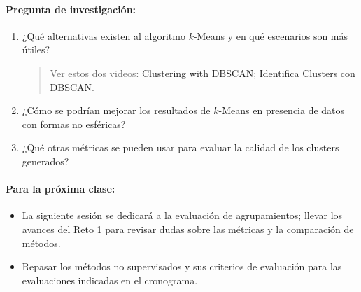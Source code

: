 \documentclass[a4,11pt]{aleph-notas}
\begin{document}
\paragraph{Pregunta de investigación:}  
\begin{enumerate}[leftmargin=*]
    \item ¿Qué alternativas existen al algoritmo $k$-Means y en qué escenarios son más útiles?
    \begin{quote}
        Ver estos dos videos: \href{https://www.youtube.com/watch?v=RDZUdRSDOok}{Clustering with DBSCAN}; \href{https://www.youtube.com/watch?v=HMis89lGdkA}{Identifica Clusters con DBSCAN}.
    \end{quote}
    \item ¿Cómo se podrían mejorar los resultados de $k$-Means en presencia de datos con formas no esféricas?
    \item ¿Qué otras métricas se pueden usar para evaluar la calidad de los clusters generados?
\end{enumerate}

\paragraph{Para la próxima clase:}
\begin{itemize}
    \item La siguiente sesión se dedicará a la evaluación de agrupamientos; llevar los avances del Reto 1 para revisar dudas sobre las métricas y la comparación de métodos.
    \item Repasar los métodos no supervisados y sus criterios de evaluación para las evaluaciones indicadas en el cronograma.

\end{itemize}

 
\end{document}
